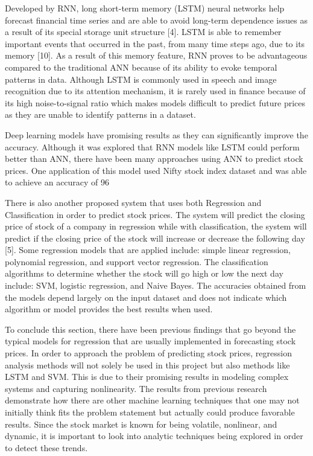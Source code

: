 \documentclass[12pt,a4paper]{article}
\begin{document}
Developed by RNN, long short-term memory (LSTM) neural networks help forecast financial time series and are able to avoid long-term dependence issues as a result of its special storage unit structure [4]. LSTM is able to remember important events that occurred in the past, from many time steps ago, due to its memory [10]. As a result of this memory feature, RNN proves to be advantageous compared to the traditional ANN because of its ability to evoke temporal patterns in data. Although LSTM is commonly used in speech and image recognition due to its attention mechanism, it is rarely used in finance because of its high noise-to-signal ratio which makes models difficult to predict future prices as they are unable to identify patterns in a dataset. 

Deep learning models have promising results as they can significantly improve the accuracy. Although it was explored that RNN models like LSTM could perform better than ANN, there have been many approaches using ANN to predict stock prices. One application of this model used Nifty stock index dataset and was able to achieve an accuracy of 96%

There is also another proposed system that uses both Regression and Classification in order to predict stock prices. The system will predict the closing price of stock of a company in regression while with classification, the system will predict if the closing price of the stock will increase or decrease the following day [5]. Some regression models that are applied include: simple linear regression, polynomial regression, and support vector regression. The classification algorithms to determine whether the stock will go high or low the next day include: SVM, logistic regression, and Naive Bayes. The accuracies obtained from the models depend largely on the input dataset and does not indicate which algorithm or model provides the best results when used. 

To conclude this section, there have been previous findings that go beyond the typical models for regression that are usually implemented in forecasting stock prices. In order to approach the problem of predicting stock prices, regression analysis methods will not solely be used in this project but also methods like LSTM and SVM. This is due to their promising results in modeling complex systems and capturing nonlinearity. The results from previous research demonstrate how there are other machine learning techniques that one may not initially think fits the problem statement but actually could produce favorable results. Since the stock market is known for being volatile, nonlinear, and dynamic, it is important to look into analytic techniques being explored in order to detect these trends.
\end{document}

